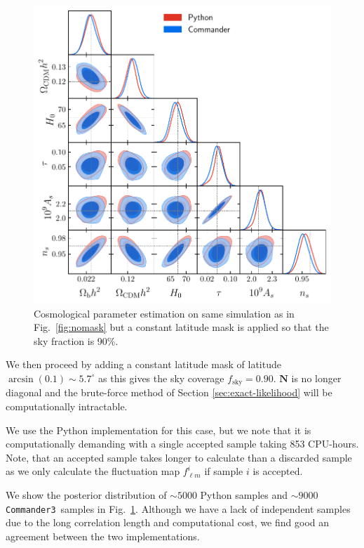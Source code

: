 \documentclass[twocolumn]{../common/aa}
\def\commanderthree{\texttt{Commander3}}
\begin{document}
\begin{figure}
	\centering
	\includegraphics[width=\linewidth]{figures/dist_posterior_10_mask.pdf}
	\caption{\label{fig:mask10}Cosmological parameter estimation on same simulation as in Fig.~\ref{fig:nomask} but a constant latitude mask is applied so that the sky fraction is 90\%.}
\end{figure}

We then proceed by adding a constant latitude mask of latitude $\arcsin(0.1) \sim 5.7^\circ$ as this gives the sky coverage $f_{\mathrm{sky}} = 0.90$. $\boldsymbol{N}$ is no longer diagonal and the brute-force method of Section \ref{sec:exact-likelihood} will be computationally intractable. 

We use the Python implementation for this case, but we note that it is computationally demanding with a single accepted sample taking 853 CPU-hours. Note, that an accepted sample takes longer to calculate than a discarded sample as we only calculate the fluctuation map $f^i_{\ell m}$ if sample $i$ is accepted.

We show the posterior distribution of $\sim 5000$ Python samples and $\sim 9000$ \commanderthree\ samples in Fig.~\ref{fig:mask10}. Although we have a lack of independent samples due to the long correlation length and computational cost, we find good an agreement between the two implementations.
\end{document}
